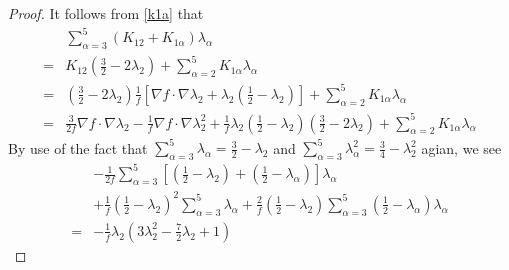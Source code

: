 \documentclass[12pt]{amsart}
\begin{document}
\begin{proof}
It follows from \eqref{k1a} that
\begin{equation*}
	\begin{aligned}
		&\sum_{\alpha=3}^5(K_{12}+K_{1\alpha })\lambda_\alpha\\
		=& K_{12}({\frac{3}{2}}-2\lambda_{2})+\sum_{\alpha=2}^5K_{1\alpha}\lambda_\alpha\\
		=&({\frac{3}{2}}-2\lambda_{2})\frac{1}{f}\left[\nabla f\cdot \nabla \lambda_2 +\lambda_2(\frac{1}{2}-\lambda_2) \right]+\sum_{\alpha=2}^5K_{1\alpha}\lambda_\alpha\\
		=&\frac{3}{2f}\nabla f\cdot \nabla \lambda_2-\frac{1}{f}\nabla f\cdot \nabla \lambda_2^2
		+\frac{1}{f}\lambda_2(\frac{1}{2}-\lambda_2)({\frac{3}{2}}-2\lambda_{2})
		+\sum_{\alpha=2}^5K_{1\alpha}\lambda_\alpha
	\end{aligned}
\end{equation*}
By use of the fact that $\sum_{\alpha=3}^5\lambda_\alpha=\frac{3}{2}-\lambda_2$ and $\sum_{\alpha=3}^5\lambda_\alpha^2=\frac{3}{4}-\lambda_2^2$ agian, we see
\begin{equation*}
	\begin{aligned}
		&-{\frac{1}{2f}}\sum_{\alpha=3}^5\left[ ({\frac{1}{2}}-\lambda_{2})+({\frac{1}{2}}-\lambda_{\alpha})\right] \lambda_\alpha\\
		 &+\frac{1}{f}(\frac{1}{2}-\lambda_{2})^2\sum_{\alpha=3}^5\lambda_{\alpha}+\frac{2}{f}({\frac{1}{2}}-\lambda_{2})\sum_{\alpha=3}^5({\frac{1}{2}}-\lambda_{\alpha})\lambda_{\alpha}\\
		=&-\frac{1}{f}\lambda_2\left( 3\lambda^2_2-\frac{7}{2}\lambda_2+1\right)
	\end{aligned}
\end{equation*}



\end{proof}
\end{document}
